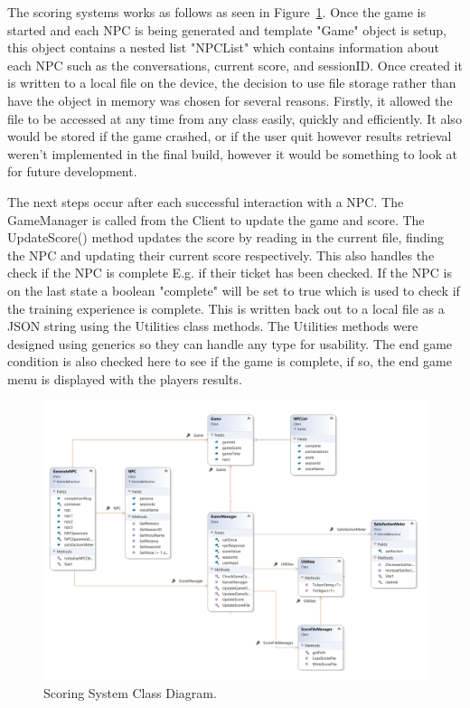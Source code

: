 The scoring systems works as follows as seen in Figure~\ref{image:Scoring}. Once the game is started and each NPC is being generated and template "Game" object is setup, this object contains a nested list "NPCList" which contains information about each NPC such as the conversations, current score, and sessionID. Once created it is written to a local file on the device, the decision to use file storage rather than have the object in memory was chosen for several reasons. Firstly, it allowed the file to be accessed at any time from any class easily, quickly and efficiently. It also would be stored if the game crashed, or if the user quit however results retrieval weren't implemented in the final build, however it would be something to look at for future development.

\par
\medskip

The next steps occur after each successful interaction with a NPC. The GameManager is called from the Client to update the game and score. The UpdateScore() method updates the score by reading in the current file, finding the NPC and updating their current score respectively. This also handles the check if the NPC is complete E.g. if their ticket has been checked. If the NPC is on the last state a boolean "complete" will be set to true which is used to check if the training experience is complete. This is written back out to a local file as a JSON string using the Utilities class methods. The Utilities methods were designed using generics so they can handle any type for usability. The end game condition is also checked here to see if the game is complete, if so, the end game menu is displayed with the players results.

\begin{figure}[h!]
	\caption{Scoring System Class Diagram.}
	\label{image:Scoring}
	\centering
	\includegraphics[width=1\textwidth]{Images/ClassDiagram Scoring.png}
\end{figure}

